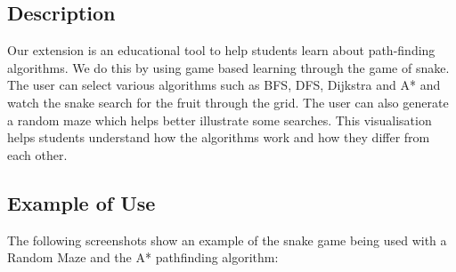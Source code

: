 \documentclass[11pt]{article}
\begin{document}
\subsection{Description}

Our extension is an educational tool to help students learn about path-finding algorithms. 
We do this by using game based learning through the game of snake. The user can select various algorithms 
such as BFS, DFS, Dijkstra and A* and watch the snake search for the fruit through the grid. 
The user can also generate a random maze which helps better illustrate some searches. 
This visualisation helps students understand how the algorithms work and how they differ from each other. 

\subsection{Example of Use}

The following screenshots show an example of the snake game being used with a Random Maze and the A* pathfinding algorithm:

\graphicspath{ {./images/} }
\end{document}
